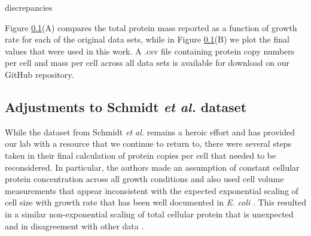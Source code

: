 discrepancies \documentclass[11pt, letterpaper]{article}
\begin{document}

Figure \ref{}(A) compares the total protein mass reported as a function of
growth rate for each of the original data sets, while in Figure \ref{}(B)  we
plot the final values that were used in this work. A .csv file containing
protein copy numbers per cell and mass per cell across all data sets is available for download on our
GitHub repository.



\subsection{Adjustments to Schmidt {\it et al.} dataset}


While the dataset from Schmidt {\it et al.} remains a heroic effort and has
provided our lab with a resource that we continue to return to,
there were several steps taken in their final calculation of protein copies per cell
that needed to be reconsidered. In particular, the authors made an assumption of
constant cellular protein concentration across all growth conditions and also
 used cell volume measurements that appear inconsistent with the expected
exponential scaling of cell size with growth rate that has been well documented in
{\it E. coli} \cite{Schaechter1958, TaheriAraghi2015, Si2017}. This resulted in
a similar non-exponential scaling of total cellular protein that is unexpected and
in disagreement with other data \cite{Basan2015}.
\end{document}
